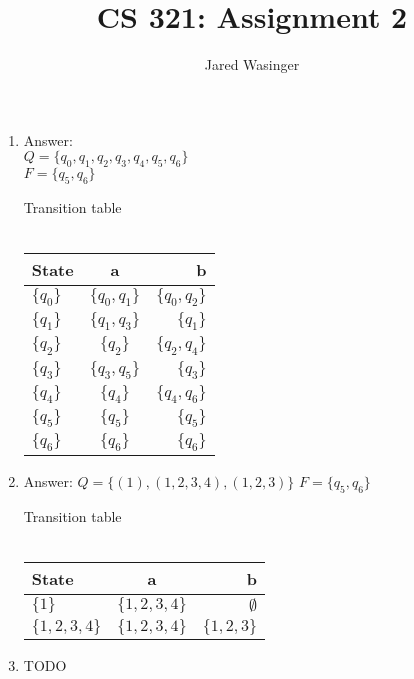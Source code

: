 \documentclass{article}
\begin{document}
  \title{CS 321: Assignment 2}
  \author{Jared Wasinger}

  \maketitle

  \begin{enumerate}
    \item Answer:\\
      $Q = \{q_0, q_1, q_2, q_3, q_4, q_5, q_6\}$\\
      $F = \{q_5, q_6\}$

      Transition table\\\\
      \begin{tabular}{ l | c | r }
        State & a & b \\ \hline
        $\{q_0\}$ & $\{q_0, q_1\}$ & $\{q_0, q_2\}$ \\

        $\{q_1\}$ & $\{q_1, q_3\}$ & $\{q_1\}$ \\

        $\{q_2\}$ & $\{q_2\}$ & $\{q_2, q_4\}$ \\

        $\{q_3\}$ & $\{q_3, q_5\}$ & $\{q_3\}$ \\

        $\{q_4\}$ & $\{q_4\}$ & $\{q_4, q_6\}$ \\

        $\{q_5\}$ & $\{q_5\}$ & $\{q_5\}$ \\

        $\{q_6\}$ & $\{q_6\}$ & $\{q_6\}$ \\
      \end{tabular}
    \item Answer:
      $Q = \{(1), (1,2,3,4), (1,2,3)\}$
      $F = \{q_5, q_6\}$

      Transition table\\\\
      \begin{tabular}{ l | c | r }
        State & a & b \\ \hline
        $\{1\}$ & $\{1,2,3,4\}$ & $\emptyset$ \\

        $\{1,2,3,4\}$ & $\{1,2,3,4\}$ & $\{1,2,3\}$ \\
      \end{tabular}
    \item TODO


\end{enumerate}
\end{document}
